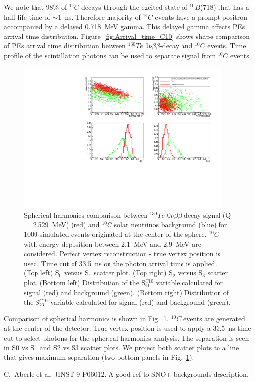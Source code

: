 \documentclass[12pt,twoside,letterpaper]{article}
\newcommand{\vbb}{0\nu\beta\beta}
\newcommand{\Te}{^{130}Te}
\newcommand{\Bten}{^{10}B}
\newcommand{\Cten}{^{10}C}
\begin{document}
We note that 98\% of $\Cten$ decays through the excited state of $\Bten$(718) that has a half-life time of $\sim$1~ns. Therefore majority of $\Cten$ events have a prompt positron accompanied by a delayed 0.718~MeV gamma. This delayed gamma affects PEs arrival time distribution. Figure~\ref{fig:Arrival_time_C10} shows shape comparison of PEs arrival time distribution between $\Te$ $\vbb$-decay and  $\Cten$ events. Time profile of the scintillation photons can be used to separate signal from $\Cten$ events.


\begin{figure}[htb]
\centering
\includegraphics[angle=0,width=0.95\textwidth]{plots/hSLPlots_C10_allLight_VtxSmear0cm_VtxShiftX0cm_33p5ns_center.pdf}
\caption{Spherical harmonics comparison between $\Te$ $\vbb$-decay signal (Q$=$2.529~MeV) (red) and $\Cten$ solar neutrinos background (blue) for 1000 simulated events originated at the center of the sphere. $\Cten$ with energy deposition between 2.1~MeV and 2.9~MeV are considered. Perfect vertex reconstruction - true vertex position is used. Time cut of 33.5~ns on the photon arrival time is applied. (Top left) S$_0$ versus S$_1$ scatter plot. (Top right) S$_2$ versus S$_3$ scatter plot. (Bottom left) Distribution of the S$^{C10}_{01}$ variable calculated for signal (red) and background (green). (Bottom right) Distribution of the S$^{C10}_{23}$ variable calculated for signal (red) and background (green).}
\label{fig:SL_C10_33p5ns_center}
\end{figure}


Comparison of spherical harmonics is shown in Fig.~\ref{fig:SL_C10_33p5ns_center}. $\Cten$ events are generated at the center of the detector. True vertex position is used to apply a 33.5~ns time cut to select photons for the spherical harmonics analysis. The separation is seen in S0 vs S1 and S2 vs S3 scatter plots. We project both scatter plots to a line that gives maximum separation (two bottom panels in Fig.~\ref{fig:SL_C10_33p5ns_center}).


\begin{thebibliography}{00}
 C.~Aberle et al. JINST 9 P06012.
 A good ref to SNO+ backgrounds description.
\end{thebibliography}
\end{document}
